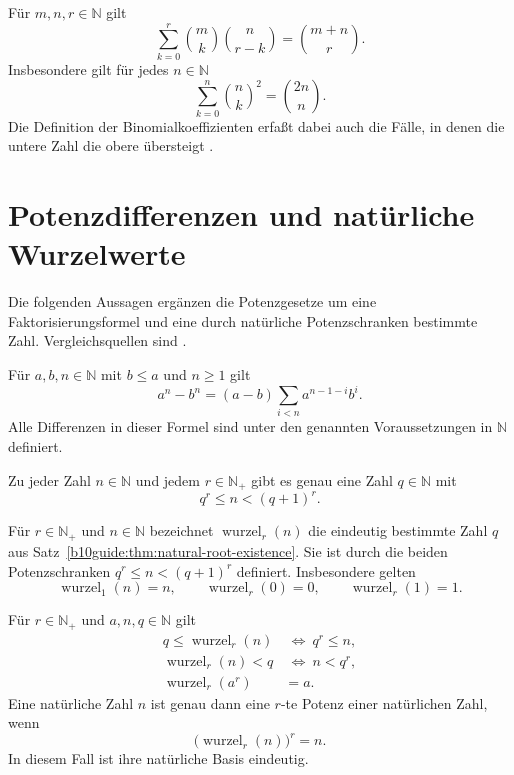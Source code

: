 \begin{theorem}
\label{b10guide:thm:vandermonde}
Für $m,n,r\in\mathbb N$ gilt
\[
 \sum_{k=0}^{r}\binom mk\binom n{r-k}=\binom{m+n}r.
\]
Insbesondere gilt für jedes $n\in\mathbb N$
\[
 \sum_{k=0}^{n}\binom nk^2=\binom{2n}n.
\]
Die Definition der Binomialkoeffizienten erfaßt dabei auch die Fälle,
in denen die untere Zahl die obere übersteigt \cite{natvandermonde}.
\end{theorem}

\section{Potenzdifferenzen und natürliche Wurzelwerte}

Die folgenden Aussagen ergänzen die Potenzgesetze um eine
Faktorisierungsformel und eine durch natürliche Potenzschranken
bestimmte Zahl. Vergleichsquellen sind \cite{natgeomsum,natroot}.

\begin{theorem}
\label{b10guide:thm:power-difference}
Für $a,b,n\in\mathbb N$ mit $b\le a$ und $n\ge1$ gilt
\[
 a^n-b^n=(a-b)\sum_{i<n}a^{n-1-i}b^i.
\]
Alle Differenzen in dieser Formel sind unter den genannten
Voraussetzungen in $\mathbb N$ definiert.
\end{theorem}

\begin{theorem}
\label{b10guide:thm:natural-root-existence}
Zu jeder Zahl $n\in\mathbb N$ und jedem $r\in\mathbb N_+$
gibt es genau eine Zahl $q\in\mathbb N$ mit
\[
 q^r\le n<(q+1)^r.
\]
\end{theorem}

\begin{definition}
\label{b10guide:def:natural-root}
Für $r\in\mathbb N_+$ und $n\in\mathbb N$ bezeichnet
$\operatorname{wurzel}_r(n)$ die eindeutig bestimmte Zahl $q$
aus Satz~\ref{b10guide:thm:natural-root-existence}.
Sie ist durch die beiden Potenzschranken $q^r\le n<(q+1)^r$
definiert. Insbesondere gelten
\[
 \operatorname{wurzel}_1(n)=n,\qquad
 \operatorname{wurzel}_r(0)=0,\qquad
 \operatorname{wurzel}_r(1)=1.
\]
\end{definition}

\begin{theorem}
\label{b10guide:thm:natural-root-characterization}
Für $r\in\mathbb N_+$ und $a,n,q\in\mathbb N$ gilt
\[
\begin{aligned}
 q\le\operatorname{wurzel}_r(n)&\ \Longleftrightarrow\ q^r\le n,\\
 \operatorname{wurzel}_r(n)<q&\ \Longleftrightarrow\ n<q^r,\\
 \operatorname{wurzel}_r(a^r)&=a.
\end{aligned}
\]
Eine natürliche Zahl $n$ ist genau dann eine $r$-te Potenz
einer natürlichen Zahl, wenn
\[
 \bigl(\operatorname{wurzel}_r(n)\bigr)^r=n.
\]
In diesem Fall ist ihre natürliche Basis eindeutig.
\end{theorem}

